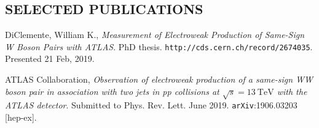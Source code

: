 \documentclass[11pt]{res}
\begin{document}
\begin{resume}
%
%

\section{SELECTED PUBLICATIONS}
    DiClemente, William K., {\it Measurement of Electroweak Production of Same-Sign W Boson Pairs with ATLAS}.  PhD thesis. {\tt http://cds.cern.ch/record/2674035}. Presented 21 Feb, 2019.

    ATLAS Collaboration, {\it Observation of electroweak production of a same-sign WW boson pair in association with two jets in pp collisions at $\sqrt{s}=13~\textrm{TeV}$ with the ATLAS detector}. Submitted to Phys. Rev. Lett. June 2019. {\tt arXiv}:1906.03203 [hep-ex].

 
 
 
\end{resume}
\end{document}

